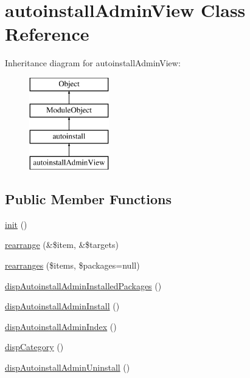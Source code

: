\hypertarget{classautoinstallAdminView}{\section{autoinstall\+Admin\+View Class Reference}
\label{classautoinstallAdminView}
}
Inheritance diagram for autoinstall\+Admin\+View\+:\begin{figure}[H]
\begin{center}
\leavevmode
\includegraphics[height=4.000000cm]{classautoinstallAdminView}
\end{center}
\end{figure}
\subsection*{Public Member Functions}
\begin{DoxyCompactItemize}
\item 
\hyperlink{classautoinstallAdminView_a206401d0dc48b6d0e60f1520ba972526}{init} ()
\item 
\hyperlink{classautoinstallAdminView_a55e52a58461106215866abf53264edb5}{rearrange} (\&\$item, \&\$targets)
\item 
\hyperlink{classautoinstallAdminView_a16c6adf0c6d6f8bb24851dd5b68416f5}{rearranges} (\$items, \$packages=null)
\item 
\hyperlink{classautoinstallAdminView_a57de04bc93c4b62ad0c8fff257b4a837}{disp\+Autoinstall\+Admin\+Installed\+Packages} ()
\item 
\hyperlink{classautoinstallAdminView_a096fdb7d03bea9f0b1a48dd5f471bbd2}{disp\+Autoinstall\+Admin\+Install} ()
\item 
\hyperlink{classautoinstallAdminView_af3c3bcabc77b8e0d812db60bfc8bc621}{disp\+Autoinstall\+Admin\+Index} ()
\item 
\hyperlink{classautoinstallAdminView_ac3b285aaf0eb96bbfb2986917ca3571b}{disp\+Category} ()
\item 
\hyperlink{classautoinstallAdminView_a5f7303fa7b93ab464b65e0917b8d75ca}{disp\+Autoinstall\+Admin\+Uninstall} ()
\end{DoxyCompactItemize}
